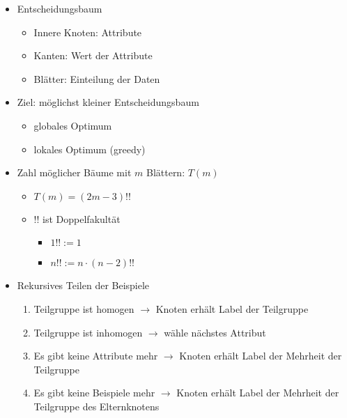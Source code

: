 \documentclass[nonacm=true, language=german]{acmart}
\begin{document}
\begin{itemize}
    \item Entscheidungsbaum
    \begin{itemize}
        \item Innere Knoten: Attribute
        \item Kanten: Wert der Attribute
        \item Blätter: Einteilung der Daten
    \end{itemize}
    
    \item Ziel: möglichst kleiner Entscheidungsbaum
    \begin{itemize}
        \item globales Optimum
        \item lokales Optimum (greedy)
    \end{itemize}
    
    \item Zahl möglicher Bäume mit $m$ Blättern: $T(m)$
    \begin{itemize}
        \item $ T(m) = (2m - 3)!! $
        \item $!!$ ist Doppelfakultät
        \begin{itemize}
            \item $ 1!! := 1 $
            \item $ n!! := n \cdot (n - 2)!! $
        \end{itemize}
    \end{itemize}
    
    \item Rekursives Teilen der Beispiele
    \begin{enumerate}
        \item Teilgruppe ist homogen $\rightarrow$ Knoten erhält Label der Teilgruppe
        \item Teilgruppe ist inhomogen $\rightarrow$ wähle nächstes Attribut
        \item Es gibt keine Attribute mehr $\rightarrow$ Knoten erhält Label der Mehrheit der Teilgruppe
        \item Es gibt keine Beispiele mehr $\rightarrow$ Knoten erhält Label der Mehrheit der Teilgruppe des Elternknotens
    \end{enumerate}
    

\end{itemize}
\end{document}
